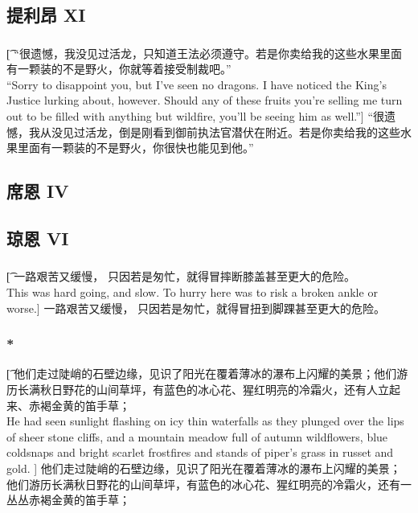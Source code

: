 \documentclass[12pt,a4paper]{article}
\begin{document}
\subsection{提利昂 XI}

\subsubsection{}\t[
	“很遗憾，我没见过活龙，只知道王法必须遵守。若是你卖给我的这些水果里面有一颗装的不是野火，你就等着接受制裁吧。”\\
	“Sorry to disappoint you, but I've seen no dragons. I have noticed the King's Justice lurking about, however. Should any of these fruits you're selling me turn out to be filled with anything but wildfire, you'll be seeing him as well.”]
	“很遗憾，我从没见过活龙，倒是刚看到御前执法官潜伏在附近。若是你卖给我的这些水果里面有一颗装的不是野火，你很快也能见到他。”
	
\subsection{席恩 IV}

\subsection{琼恩 VI}
\subsubsection{}\t[
	一路艰苦又缓慢， 只因若是匆忙，就得冒摔断膝盖甚至更大的危险。\\
	This was hard going, and slow. To hurry here was to risk a broken ankle or worse.]
	一路艰苦又缓慢， 只因若是匆忙，就得冒扭到脚踝甚至更大的危险。

\subsubsection{\color{red}*}\t[
	他们走过陡峭的石壁边缘，见识了阳光在覆着薄冰的瀑布上闪耀的美景；他们游历长满秋日野花的山间草坪，有蓝色的冰心花、猩红明亮的冷霜火，还有人立起来、赤褐金黄的笛手草；\\
	He had 	seen sunlight flashing on icy thin waterfalls as they plunged over the lips of sheer stone cliffs, and a mountain meadow full of autumn wildflowers, blue coldsnaps and bright scarlet frostfires and stands of piper's grass in russet and gold. ]
	他们走过陡峭的石壁边缘，见识了阳光在覆着薄冰的瀑布上闪耀的美景；他们游历长满秋日野花的山间草坪，有蓝色的冰心花、猩红明亮的冷霜火，还有一丛丛赤褐金黄的笛手草；
	
\end{document}
